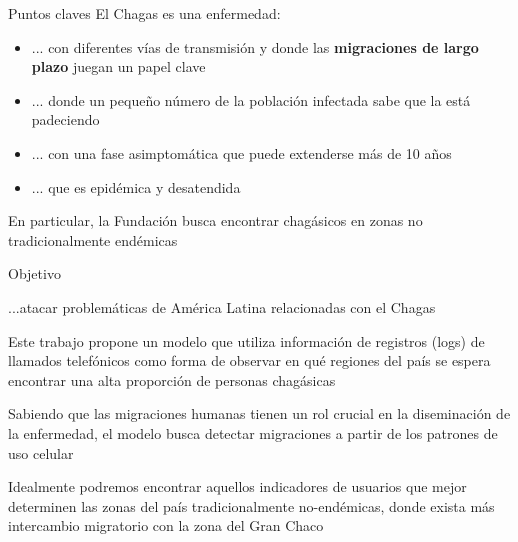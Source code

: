 \documentclass{beamer}
\begin{document}
\begin{frame}{Puntos claves}
	El Chagas es una enfermedad:
	\begin{itemize}
		\item ... con diferentes vías de transmisión y donde las \textbf{migraciones de largo plazo} juegan un papel clave
		\item ... donde un pequeño número de la población infectada sabe que la está padeciendo
		\item ... con una fase asimptomática que puede extenderse más de 10 años
		\item ... que es epidémica y desatendida
	\end{itemize}
	En particular, la Fundación busca encontrar chagásicos en zonas no tradicionalmente endémicas
\end{frame}


\begin{frame}{Objetivo}
	\begin{block}{ ...atacar problemáticas de América Latina relacionadas con el Chagas}

	Este trabajo propone un modelo que utiliza información de registros (logs) de llamados telefónicos
	como forma de observar en qué regiones del país se espera encontrar una alta proporción de personas chagásicas

	\bigskip
	Sabiendo que las migraciones humanas tienen un rol crucial en la diseminación de la enfermedad, el modelo busca
	detectar migraciones a partir de los patrones de uso celular

	\bigskip
	Idealmente podremos encontrar aquellos indicadores de usuarios que mejor determinen las zonas del país tradicionalmente no-endémicas, donde exista más intercambio migratorio con la zona del Gran Chaco
	\end{block}
\end{frame}
\end{document}

